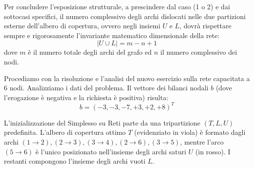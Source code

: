 \documentclass[12pt, a4paper]{article}
\newcommand{\separatore}{\noindent{\color{titlecolor!50}\rule{\textwidth}{0.6pt}}}
\begin{document}
	Per concludere l'esposizione strutturale, a prescindere dal caso (1 o 2) e dai sottocasi specifici, il numero complessivo degli archi dislocati nelle due partizioni esterne dell'albero di copertura, ovvero negli insiemi $U$ e $L$, dovrà rispettare sempre e rigorosamente l'invariante matematico dimensionale della rete:
	\[ |U \cup L| = m - n + 1 \]
	dove $m$ è il numero totale degli archi del grafo ed $n$ il numero complessivo dei nodi.
	
	\vspace{0.6cm}
	\separatore
	\vspace{0.4cm}
	
	Procediamo con la risoluzione e l'analisi del nuovo esercizio sulla rete capacitata a 6 nodi.
	Analizziamo i dati del problema. Il vettore dei bilanci nodali $b$ (dove l'erogazione è negativa e la richiesta è positiva) risulta:
	\[ b = (-3, -3, -7, +3, +2, +8)^T \]
	
	L'inizializzazione del Simplesso su Reti parte da una tripartizione $(T, L, U)$ predefinita. L'albero di copertura ottimo $T$ (evidenziato in viola) è formato dagli archi $(1\to2), (2\to3), (3\to4), (2\to6), (3\to5)$, mentre l'arco $(5\to6)$ è l'unico posizionato nell'insieme degli archi saturi $U$ (in rosso). I restanti compongono l'insieme degli archi vuoti $L$.
	
\end{document}
